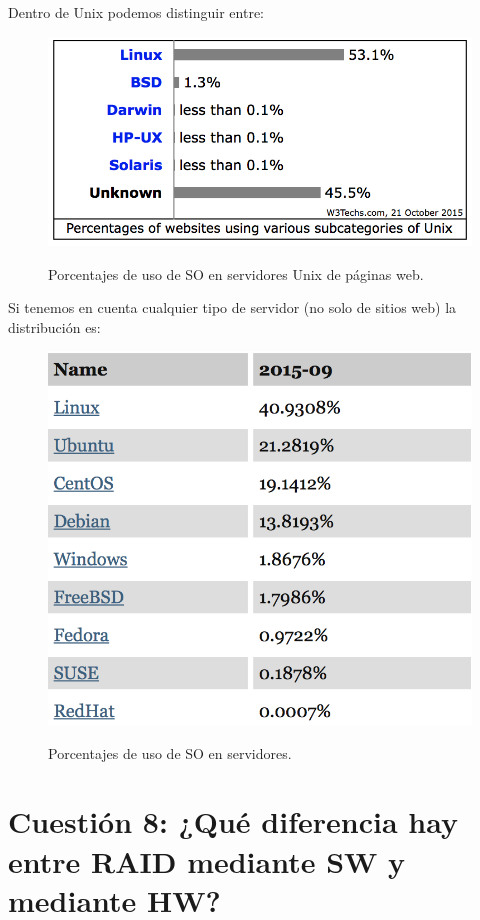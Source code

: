 Dentro de Unix podemos distinguir entre:
\begin{figure}[H]
\centering
\includegraphics{w3tech2}
\caption{Porcentajes de uso de SO en servidores Unix de páginas web.}
\cite{figura2}
\end{figure}
Si tenemos en cuenta cualquier tipo de servidor (no solo de sitios web) la distribución es:
\begin{figure}[H]
\centering
\includegraphics[scale=0.5]{w3tech3}
\caption{Porcentajes de uso de SO en servidores.}
\cite{figura3}
\end{figure}

\newpage

\section{Cuestión 8: ¿Qué diferencia hay entre RAID mediante SW y mediante HW?}

